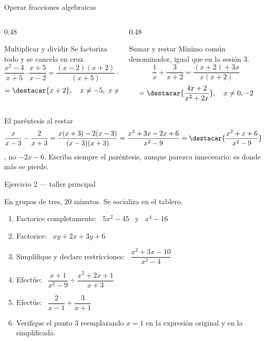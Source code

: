 \documentclass[aspectratio=169,10pt]{beamer}
\begin{document}
\begin{frame}{Operar fracciones algebraicas}
  \scriptsize
  \begin{columns}[T,onlytextwidth]
    \begin{column}{0.48\textwidth}
      \begin{exampleblock}{Multiplicar y dividir}
        \tiny
        Se factoriza todo y se cancela en cruz. 
        \[ \frac{x^{2}-4}{x+5}\cdot\frac{x+5}{x-2}
         = \frac{(x-2)(x+2)}{(x+5)}\cdot\frac{(x+5)}{(x-2)} \]
        \[ = \destacar{x+2}, \quad x\neq -5,\ x\neq 2 \]
      \end{exampleblock}
    \end{column}
    \begin{column}{0.48\textwidth}
      \begin{exampleblock}{Sumar y restar}
        \tiny
        Mínimo común denominador, igual que en la sesión 3.
        \[ \frac{1}{x}+\frac{3}{x+2}
         = \frac{(x+2)+3x}{x(x+2)} \]
        \[ = \destacar{\frac{4x+2}{x^{2}+2x}}, \quad x\neq 0,-2 \]
      \end{exampleblock}
    \end{column}
  \end{columns}

  \vspace{0.12cm}
  \begin{alertblock}{El paréntesis al restar}
    \tiny
    \[ \frac{x}{x-3}-\frac{2}{x+3}
     = \frac{x(x+3)-2(x-3)}{(x-3)(x+3)}
     = \frac{x^{2}+3x-2x+6}{x^{2}-9}
     = \destacar{\frac{x^{2}+x+6}{x^{2}-9}} \]
    , no $-2x-6$. Escriba siempre el
    paréntesis, aunque parezca innecesario: es donde más se pierde.
  \end{alertblock}
\end{frame}

\begin{frame}{Ejercicio 2 — taller principal}
  \begin{alertblock}{En grupos de tres, 20 minutos. Se socializa en el tablero.}
    \scriptsize
    \begin{enumerate}\setlength{\itemsep}{0.0cm}
      \item Factorice completamente: \ $5x^{2}-45$ \ y \ $x^{4}-16$
      \item Factorice: \ $xy+2x+3y+6$
      \item Simplifique y declare restricciones: \
            $\dfrac{x^{2}+3x-10}{x^{2}-4}$
      \item Efectúe: \ $\dfrac{x+1}{x^{2}-9}\div\dfrac{x^{2}+2x+1}{x+3}$
      \item Efectúe: \ $\dfrac{2}{x-1}+\dfrac{3}{x+1}$
      \item Verifique el punto 3 reemplazando $x=1$ en la expresión original y
            en la simplificada.
    \end{enumerate}
  \end{alertblock}
\end{frame}
\end{document}
